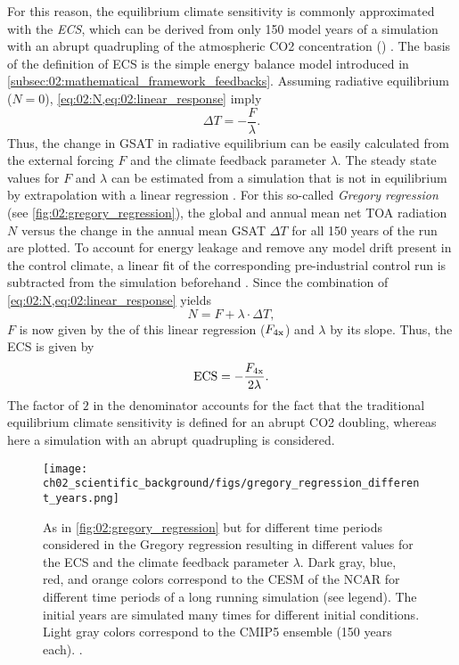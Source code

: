 For this reason, the equilibrium climate sensitivity is commonly approximated
with the \emph{\acf{ECS}}, which can be derived from only 150 model years of a
simulation with an abrupt quadrupling of the atmospheric \ac{CO2} concentration
() \autocite{Gregory2004}. The basis of the definition of \ac{ECS}
is the simple energy balance model introduced in
\cref{subsec:02:mathematical_framework_feedbacks}. Assuming radiative
equilibrium ($N = 0$), \cref{eq:02:N,eq:02:linear_response} imply
\begin{equation}
  \Delta T = -\frac{F}{\lambda}.
  \label{eq:02:delta_t_eq}
\end{equation} Thus, the change in \ac{GSAT} in radiative equilibrium can be
easily calculated from the external forcing $F$ and the climate feedback
parameter $\lambda$. The steady state values for $F$ and $\lambda$ can be
estimated from a  simulation that is not in equilibrium by
extrapolation with a linear regression \autocite{Gregory2004}. For this
so-called \emph{Gregory regression} (see \cref{fig:02:gregory_regression}), the
global and annual mean net \ac{TOA} radiation $N$ versus the change in the
annual mean \ac{GSAT} $\Delta T$ for all 150 years of the  run are
plotted. To account for energy leakage and remove any model drift present in
the control climate, a linear fit of the corresponding pre-industrial control
run is subtracted from the  simulation beforehand
\autocite{Andrews2012}. Since the combination of
\cref{eq:02:N,eq:02:linear_response} yields
\begin{equation}
  N = F + \lambda \cdot \Delta T,
  \label{eq:02:N_vs_delta_t}
\end{equation}
$F$ is now given by the \yintercept{} of this linear regression
($F_{\textnormal{4x}}$) and $\lambda$ by its slope. Thus, the \ac{ECS} is given by
\begin{equation}
  \textnormal{ECS} = -\frac{F_{\textnormal{4x}}}{2 \lambda}.
  \label{eq:02:ecs}
\end{equation}
The factor of $2$ in the denominator accounts for the fact that the traditional
equilibrium climate sensitivity is defined for an abrupt \ac{CO2} doubling,
whereas here a simulation with an abrupt quadrupling is considered.

\begin{figure}[t]
  \centering
  \texttt{[image: 
    ch02\_scientific\_background/figs/gregory\_regression\_different\_years.png]}
  \caption[
  Gregory regression for different time periods.
  ]{
    As in \cref{fig:02:gregory_regression} but for different time periods
    considered in the Gregory regression resulting in different values for the
    \acf{ECS} and the climate feedback parameter $\lambda$. Dark gray, blue,
    red, and orange colors correspond to the \acf{CESM} of the \acf{NCAR} for
    different time periods of a long running simulation (see legend). The
    initial years are simulated many times for different initial conditions.
    Light gray colors correspond to the \acs{CMIP}5 ensemble (150 years each).
    .
  }
  \label{fig:02:gregory_regression_different_years}
\end{figure}


